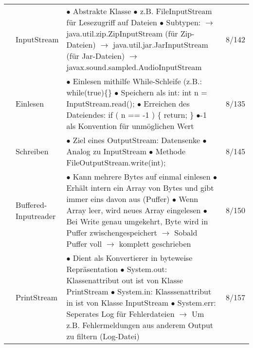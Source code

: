 \documentclass[11pt,a4paper]{article}
\begin{document}
\begin{center}
\begin{longtable}[h]{ | p{2.3cm} | p{2.3cm} | p{12.6cm} | p{1.2cm} | }
	& InputStream & \makecell[l]{$\bullet$ Abstrakte Klasse \\
	$\bullet$ z.B. FileInputStream für Lesezugriff auf Dateien \\
	$\bullet$ Subtypen: \\
	\hspace{0.4cm} $\rightarrow$ java.util.zip.ZipInputStream (für Zip-Dateien) \\
	\hspace{0.4cm} $\rightarrow$ java.util.jar.JarInputStream (für Jar-Dateien) \\
	\hspace{0.4cm} $\rightarrow$ javax.sound.sampled.AudioInputStream} & 8/142 \\ \cline{2-4}
	
	& Einlesen & \makecell[l]{$\bullet$ Einlesen mithilfe While-Schleife (z.B.: while(true)\{\} \\
	$\bullet$  Speichern als int: int n = InputStream.read(); \\
	$\bullet$ Erreichen des Dateiendes: if ( n == -1 ) \{ return; \} \\
	$\bullet$-1 als Konvention für unmöglichen Wert} & 8/135 \\ \cline{2-4}
	
	& Schreiben & \makecell[l]{$\bullet$ Ziel eines OutputStream: Datensenke \\
	$\bullet$ Analog zu InputStream \\
	$\bullet$ Methode FileOutputStream.write(int); }  & 8/145 \\ \cline{2-4}
	
	& \makecell[l]{Buffered-\\ Inputreader} & \makecell[l]{$\bullet$ Kann mehrere Bytes auf einmal einlesen \\
	$\bullet$ Erhält intern ein Array von Bytes und gibt immer eins davon aus (Puffer)\\
	$\bullet$ Wenn Array leer, wird neues Array eingelesen \\
	$\bullet$ Bei Write genau umgekehrt, Byte wird in Puffer zwischengespeichert \\
	\hspace{0.4cm} $\rightarrow$ Sobald Puffer voll $\rightarrow$ komplett geschrieben }  & 8/150 \\ \cline{2-4}
	
	& PrintStream & \makecell[l]{$\bullet$ Dient als Konvertierer in byteweise Repräsentation \\
	$\bullet$ System.out: Klassenattribut out ist von Klasse PrintStream \\
	$\bullet$ System.in: Klasssenattribut in ist von Klasse InputStream \\ 
	$\bullet$ System.err: Seperates Log für Fehlerdateien \\ 
	\hspace{0.4cm} $\rightarrow$ Um z.B. Fehlermeldungen aus anderem Output zu filtern (Log-Datei) }  & 8/157 \\ \cline{2-4}
	

\end{longtable}
\end{center}
\end{document}
